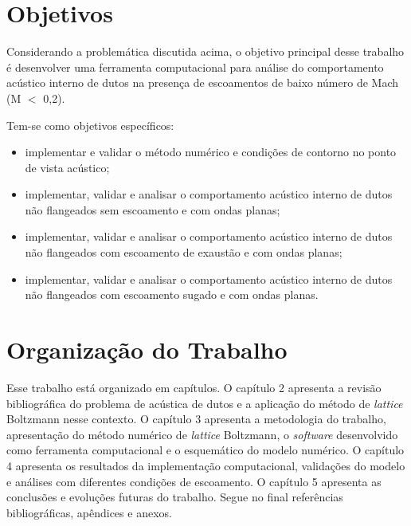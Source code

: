 \section{Objetivos}

Considerando a problemática discutida acima, o objetivo principal desse trabalho é desenvolver uma ferramenta computacional para análise do comportamento acústico interno de dutos na presença de escoamentos de baixo número de Mach (M $<$ 0,2).

Tem-se como objetivos específicos:
\begin{itemize}
    \item implementar e validar o método numérico e condições de contorno no ponto de vista acústico;
    \item implementar, validar e analisar o comportamento acústico interno de dutos não flangeados sem escoamento e com ondas planas;
    \item implementar, validar e analisar o comportamento acústico interno de dutos não flangeados com escoamento de exaustão e com ondas planas;
    \item implementar, validar e analisar o comportamento acústico interno de dutos não flangeados com escoamento sugado e com ondas planas.
\end{itemize}

\section{Organização do Trabalho}

Esse trabalho está organizado em capítulos. O capítulo 2 apresenta a revisão bibliográfica do problema de acústica de dutos e a aplicação do método de \textit{lattice} Boltzmann nesse contexto. O capítulo 3 apresenta a metodologia do trabalho, apresentação do método numérico de \textit{lattice} Boltzmann, o \textit{software} desenvolvido como ferramenta computacional e o esquemático do modelo numérico. O capítulo 4 apresenta os resultados da implementação computacional, validações do modelo e análises com diferentes condições de escoamento. O capítulo 5 apresenta as conclusões e evoluções futuras do trabalho. Segue no final referências bibliográficas, apêndices e anexos.